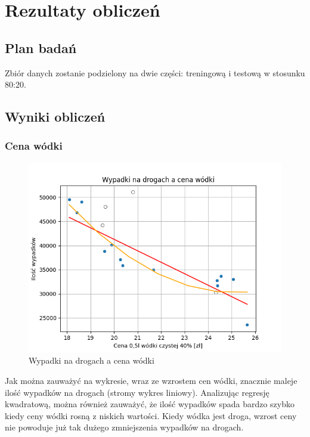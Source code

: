 \documentclass[10pt]{article}
\begin{document}
\section{Rezultaty obliczeń}

\subsection{Plan badań}
Zbiór danych zostanie podzielony na dwie części: treningową i testową w stosunku 80:20. 
\pagebreak

\subsection{Wyniki obliczeń}

\subsubsection{Cena wódki}
\begin{figure}[h]
\begin{center}
\includegraphics[width=0.5\linewidth]{images/plots/wodka.png}
\caption{Wypadki na drogach a cena wódki}
\end{center}
\end{figure}
Jak można zauważyć na wykresie, wraz ze wzrostem cen wódki, znacznie maleje ilość wypadków na drogach (stromy wykres liniowy). Analizując regresję kwadratową, można również zauważyć, że ilość wypadków spada bardzo szybko kiedy ceny wódki rosną z niskich wartości. Kiedy wódka jest droga, wzrost ceny nie powoduje już tak dużego zmniejszenia wypadków na drogach. 
\end{document}
